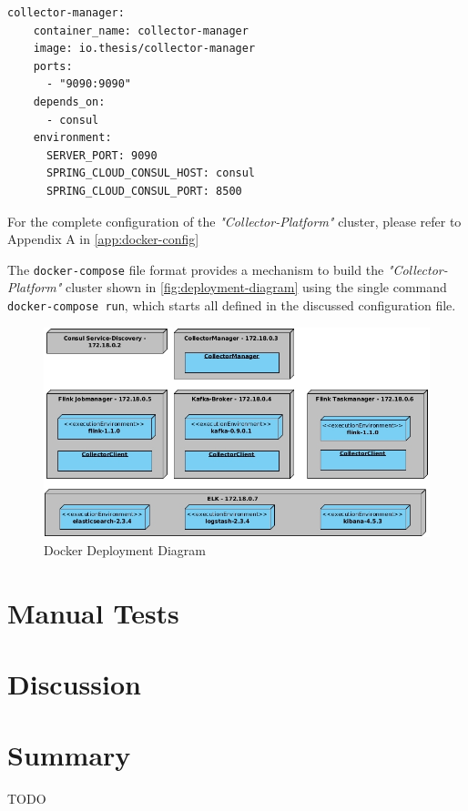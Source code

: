 \begin{lstlisting}[caption={CollectorManager container configuration}, captionpos=b, label={lst:docker-manager}]
  collector-manager:
    container_name: collector-manager
    image: io.thesis/collector-manager
    ports:
      - "9090:9090"
    depends_on:
      - consul
    environment:
      SERVER_PORT: 9090
      SPRING_CLOUD_CONSUL_HOST: consul
      SPRING_CLOUD_CONSUL_PORT: 8500
\end{lstlisting}

For the complete configuration of the \textit{"Collector-Platform"} cluster, please refer to Appendix A in \autoref{app:docker-config}

The \verb|docker-compose| file format provides a mechanism to build the \textit{"Collector-Platform"} cluster shown in
\autoref{fig:deployment-diagram} using the single command \verb|docker-compose run|, which starts all defined in the discussed configuration
file.

\begin{figure}[H]
	\centering
	\includegraphics[width=1.0\textwidth]{../uml/deployment-diagram.jpg}
	\caption{Docker Deployment Diagram}
	\label{fig:deployment-diagram}
\end{figure}

\section{Manual Tests}

%
%

\section{Discussion}
\section{Summary}

TODO

